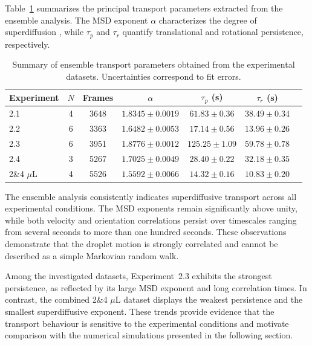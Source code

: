 Table~\ref{tab:ensemble_summary} summarizes the principal transport parameters extracted from the ensemble analysis. The MSD exponent $\alpha$ characterizes the degree of superdiffusion \cite{balakrishnan2021}, while $\tau_p$ and $\tau_r$ quantify translational and rotational persistence, respectively.
\begin{table}[H]
\centering
\caption{Summary of ensemble transport parameters obtained from the experimental datasets. Uncertainties correspond to fit errors.}
\label{tab:ensemble_summary}
\begin{tabular}{lcccccc}
\toprule
Experiment & $N$ & Frames & $\alpha$ & $\tau_p$ (s) & $\tau_r$ (s) \\
\midrule
2.1 & 4 & 3648  & $1.8345 \pm 0.0019$ & $61.83 \pm 0.36$  & $38.49 \pm 0.34$ \\
2.2 & 6 & 3363  & $1.6482 \pm 0.0053$ & $17.14 \pm 0.56$  & $13.96 \pm 0.26$ \\
2.3 & 6 & 3951  & $1.8776 \pm 0.0012$ & $125.25 \pm 1.09$ & $59.78 \pm 0.78$ \\
2.4 & 3 & 5267  & $1.7025 \pm 0.0049$ & $28.40 \pm 0.22$  & $32.18 \pm 0.35$ \\
2\&4 $\mu$L & 4 & 5526 & $1.5592 \pm 0.0066$ & $14.32 \pm 0.16$ & $10.83 \pm 0.20$ \\
\bottomrule
\end{tabular}
\end{table}

The ensemble analysis consistently indicates superdiffusive transport\cite{balakrishnan2021} across all experimental conditions. The MSD exponents remain significantly above unity, while both velocity and orientation correlations persist over timescales ranging from several seconds to more than one hundred seconds. These observations demonstrate that the droplet motion is strongly correlated and cannot be described as a simple Markovian random walk\cite{schutz2004,balakrishnan2021}.

Among the investigated datasets, Experiment~2.3 exhibits the strongest persistence, as reflected by its large MSD exponent and long correlation times. In contrast, the combined 2\&4 $\mu$L dataset displays the weakest persistence and the smallest superdiffusive exponent. These trends provide evidence that the transport behaviour is sensitive to the experimental conditions and motivate comparison with the numerical simulations presented in the following section.
